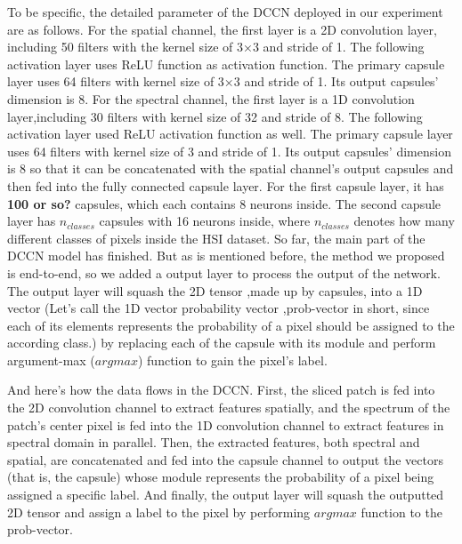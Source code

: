 \documentclass{article}
\begin{document}
	To be specific, the detailed parameter of the DCCN deployed in our experiment are as follows.
	For the spatial channel, the first layer is a 2D convolution layer, including 50 filters with the kernel size of
	3×3 and stride of 1.
	The following activation layer uses ReLU function as activation function.
	The primary capsule layer uses 64 filters with kernel size of 3×3 and stride of 1.
	Its output capsules' dimension is 8.
	For the spectral channel, the first layer is a 1D convolution layer,including 30 filters with kernel size of 32 and
	stride of 8.
	The following activation layer used ReLU activation function as well.
	The primary capsule layer uses 64 filters with kernel size of 3 and stride of 1.
	Its output capsules' dimension is 8 so that it can be concatenated with the spatial channel's output capsules and
	then fed into the fully connected capsule layer.
	For the first capsule layer, it has \textbf{100 or so?} capsules, which each contains 8 neurons inside.
	The second capsule layer has $n_{classes}$ capsules with 16 neurons inside, where $n_{classes}$ denotes how many
	different classes of pixels inside the HSI dataset.
	So far, the main part of the DCCN model has finished.
	But as is mentioned before, the method we proposed is end-to-end, so we added a output layer to process the output
	of the network.
	The output layer will squash the 2D tensor ,made up by capsules, into a 1D vector (Let's call the 1D vector
	probability vector ,prob-vector in short, since each of its elements represents the probability of a pixel should
	be assigned to the according class.) by replacing each of the capsule with its module and perform argument-max
	($argmax$) function to gain the pixel's label.


	And here's how the data flows in the DCCN.
	First, the sliced patch is fed into the 2D convolution channel to extract features spatially, and the spectrum
	of the patch's center pixel is fed into the 1D convolution channel to extract features in spectral domain in
	parallel.
	Then, the extracted features, both spectral and spatial, are concatenated and fed into the capsule channel to output
	the vectors (that is, the capsule) whose module represents the probability of a pixel being assigned a specific
	label.
	And finally, the output layer will squash the outputted 2D tensor and assign a label to the pixel by performing
	$argmax$ function to the prob-vector.
\end{document}
